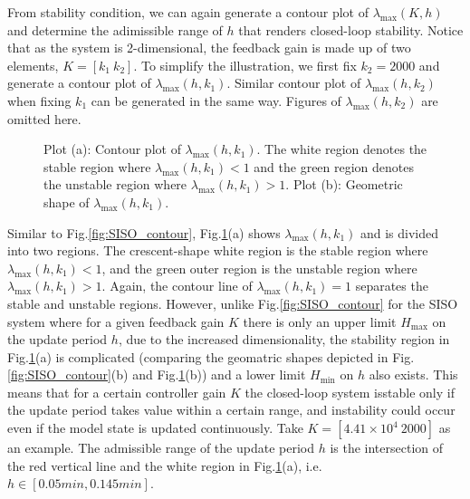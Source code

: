 \documentclass[letterpaper, 10 pt, conference]{ieeeconf}\IEEEoverridecommandlockouts%
\begin{document}
From stability condition, we can again generate a contour plot of $\lambda_{\max}(K,h)$ and determine the adimissible range of $h$ that renders closed-loop stability. Notice that as the system is 2-dimensional, the feedback gain is made up of two elements, $K = [k_1\ k_2]$. To simplify the illustration, we first fix $k_2 = 2000$ and generate a contour plot of $\lambda_{\max}(h,k_1)$. Similar contour plot of $\lambda_{\max}(h,k_2)$ when fixing $k_1$ can be generated in the same way. Figures of $\lambda_{\max}(h,k_2)$ are omitted here.

\begin{figure}[hptb]
  \centerline{\hspace{2mm}\hspace{-4mm}{\footnotesize (a)}
  \hspace{-4mm}{\footnotesize (b)}}
  \caption{Plot (a): Contour plot of $\lambda_{\max}(h,k_1)$. The white region denotes the stable region where $\lambda_{\max}(h,k_1) < 1$ and the green region denotes the unstable region where $\lambda_{\max}(h,k_1) > 1$. Plot (b): Geometric shape of $\lambda_{\max}(h,k_1)$.}\label{fig:CSTR_contour}
\end{figure}

Similar to Fig.\ref{fig:SISO_contour}, Fig.\ref{fig:CSTR_contour}(a) shows $\lambda_{\max}(h,k_1)$ and is divided into two regions. The crescent-shape white region is the stable region where $\lambda_{\max}(h,k_1) < 1$, and the green outer region is the unstable region where $\lambda_{\max}(h,k_1) > 1$. Again, the contour line of $\lambda_{\max}(h,k_1) = 1$ separates the stable and unstable regions. However, unlike Fig.\ref{fig:SISO_contour} for the SISO system where for a given feedback gain $K$ there is only an upper limit $H_{\max}$ on the update period $h$, due to the increased dimensionality, the stability region in Fig.\ref{fig:CSTR_contour}(a) is complicated (comparing the geomatric shapes depicted in Fig.\ref{fig:SISO_contour}(b) and Fig.\ref{fig:CSTR_contour}(b)) and a lower limit $H_{\min}$ on $h$ also exists. This means that for a certain controller gain $K$ the closed-loop system isstable only  if the update period takes value within a certain range, and instability could occur even if the model state is updated continuously. Take $K = [4.41\times 10^4\ 2000]$ as an example. The admissible range of the update period $h$ is the intersection of the red vertical line and the white region in Fig.\ref{fig:CSTR_contour}(a), i.e. $h\in [0.05min, 0.145min]$.
\end{document}
